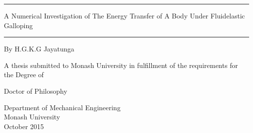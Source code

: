 \documentclass[11pt,titlepage,twoside,a4paper]{report}
\newcommand{\myclearpage}{\thispagestyle{empty}\cleartoevenpage\thispagestyle{empty}\cleartooddpage}
\begin{document}
\begin{titlepage}
\noindent\rule{\textwidth}{1.5pt}
\begin{flushright}
\LARGE
{\sc A Numerical Investigation of The Energy Transfer of A Body Under Fluidelastic Galloping} \\

\noindent\rule{\textwidth}{1.5pt}

\LARGE
\vspace{30mm}
{\sc By H.G.K.G Jayatunga}
\vspace{30mm}

\normalsize
{\sc A thesis submitted to Monash University in fulfillment of the requirements for the Degree of}

\vspace{5mm}
\LARGE
{\sc Doctor of Philosophy}

\vspace{15mm}
\normalsize
Department of Mechanical Engineering\\
Monash University\\
October 2015
\end{flushright}

\end{titlepage}

\myclearpage



%

%       




\end{document}
